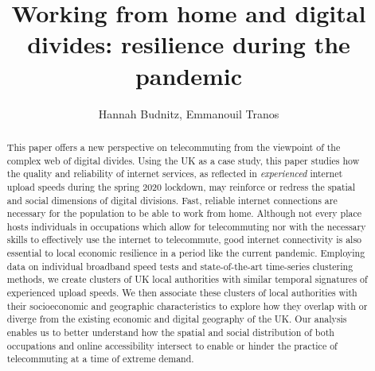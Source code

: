 \documentclass[Royal,times,sageh]{sagej}
\begin{document}
\title{Working from home and digital divides: resilience during the pandemic}

\runninghead{}

\author{Hannah Budnitz, Emmanouil Tranos}




\begin{abstract}
This paper offers a new perspective on telecommuting from the viewpoint
of the complex web of digital divides. Using the UK as a case study,
this paper studies how the quality and reliability of internet services,
as reflected in \emph{experienced} internet upload speeds during the
spring 2020 lockdown, may reinforce or redress the spatial and social
dimensions of digital divisions. Fast, reliable internet connections are
necessary for the population to be able to work from home. Although not
every place hosts individuals in occupations which allow for
telecommuting nor with the necessary skills to effectively use the
internet to telecommute, good internet connectivity is also essential to
local economic resilience in a period like the current pandemic.
Employing data on individual broadband speed tests and state-of-the-art
time-series clustering methods, we create clusters of UK local
authorities with similar temporal signatures of experienced upload
speeds. We then associate these clusters of local authorities with their
socioeconomic and geographic characteristics to explore how they overlap
with or diverge from the existing economic and digital geography of the
UK. Our analysis enables us to better understand how the spatial and
social distribution of both occupations and online accessibility
intersect to enable or hinder the practice of telecommuting at a time of
extreme demand.
\end{abstract}


\maketitle
\end{document}
